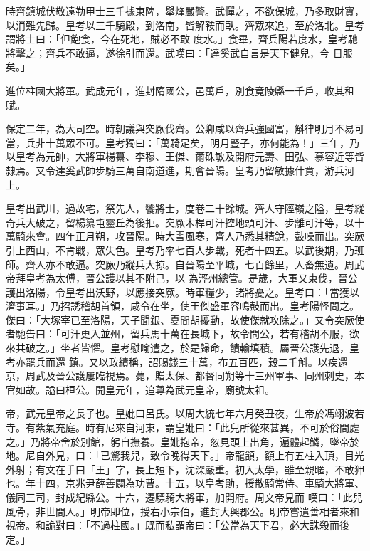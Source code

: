 \begin{pinyinscope}
 時齊鎮城伏敬遠勒甲士三千據東陴，舉烽嚴警。武憚之，不欲保城，乃多取財寶，以消難先歸。皇考以三千騎殿，到洛南，皆解鞍而臥。齊眾來追，至於洛北。皇考謂將士曰：「但飽食，今在死地，賊必不敢
 度水。」食畢，齊兵陽若度水，皇考馳將擊之；齊兵不敢逼，遂徐引而還。武嘆曰：「達奚武自言是天下健兒，今
 日服矣。」



 進位柱國大將軍。武成元年，進封隋國公，邑萬戶，別食竟陵縣一千戶，收其租賦。



 保定二年，為大司空。時朝議與突厥伐齊。公卿咸以齊兵強國富，斛律明月不易可當，兵非十萬眾不可。皇考獨曰：「萬騎足矣，明月豎子，亦何能為！」三年，乃以皇考為元帥，大將軍楊纂、李穆、王傑、爾硃敏及開府元壽、田弘、慕容近等皆隸焉。又令達奚武帥步騎三萬自南道進，期會晉陽。皇考乃留敏據什賁，游兵河上。



 皇考出武川，過故宅，祭先人，饗將士，度卷二十餘城。齊人守陘嶺之隘，皇考縱奇兵大破之，留楊纂屯靈丘為後拒。突厥木桿可汗控地頭可汗、步離可汗等，以十萬騎來會。四年正月朔，攻晉陽。時大雪風寒，齊人乃悉其精銳，鼓噪而出。突厥引上西山，不肯戰，眾失色。皇考乃率七百人步戰，死者十四五。以武後期，乃班師。齊人亦不敢逼。突厥乃縱兵大掠。自晉陽至平城，七百餘里，人畜無遺。周武帝拜皇考為太傅，晉公護以其不附己，以
 為涇州總管。是歲，大軍又東伐，晉公護出洛陽，令皇考出沃野，以應接突厥。時軍糧少，諸將憂之。皇考曰：「當獲以濟事耳。」乃招誘稽胡首領，咸令在坐，使王傑盛軍容鳴鼓而出。皇考陽怪問之。傑曰：「大塚宰已至洛陽，天子聞銀、夏間胡擾動，故使傑就攻除之。」又令突厥使者馳告曰：「可汗更入並州，留兵馬十萬在長城下，故令問公，若有稽胡不服，欲來共破之。」坐者皆懼。皇考慰喻遣之，於是歸命，饋輸填積。屬晉公護先退，皇考亦罷兵而還
 鎮。又以政績稱，詔賜錢三十萬，布五百匹，穀二千斛。以疾還京，周武及晉公護屢臨視焉。薨，贈太保、都督同朔等十三州軍事、同州刺史，本官如故。謚曰桓公。開皇元年，追尊為武元皇帝，廟號太祖。



 帝，武元皇帝之長子也。皇妣曰呂氏。以周大統七年六月癸丑夜，生帝於馮翊波若寺。有紫氣充庭。時有尼來自河東，謂皇妣曰：「此兒所從來甚異，不可於俗間處之。」乃將帝舍於別館，躬自撫養。皇妣抱帝，忽見頭上出角，遍體起鱗，墜帝於
 地。尼自外見，曰：「已驚我兒，致令晚得天下。」帝龍頷，額上有五柱入頂，目光外射；有文在手曰「王」字，長上短下，沈深嚴重。初入太學，雖至親暱，不敢狎也。年十四，京兆尹薛善闢為功曹。十五，以皇考勛，授散騎常侍、車騎大將軍、儀同三司，封成紀縣公。十六，遷驃騎大將軍，加開府。周文帝見而
 嘆曰：「此兒風骨，非世間人。」明帝即位，授右小宗伯，進封大興郡公。明帝嘗遣善相者來和視帝。和詭對曰：「不過柱國。」既而私謂帝曰：「公當為天下君，必大誅殺而後定。」




\end{pinyinscope}
